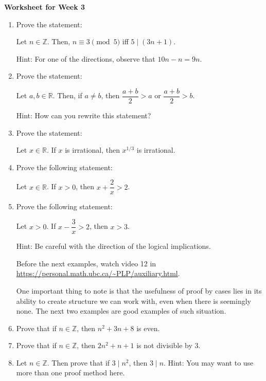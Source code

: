 \documentclass[12pt]{article}
\begin{document}
\centerline{\bf\large Worksheet for Week 3}

\vspace{25pt}


\begin{enumerate}


\item  Prove the statement:
\begin{center}
Let $n\in\mathbb Z$. Then, $n\equiv 3 \pmod 5$ iff $5\mid (3n+1)$.
\end{center}
Hint: For one of the directions, observe that $10n-n=9n$.


\item Prove the statement:
\begin{center}
Let $a,b \in\mathbb R$. Then, if $a\neq b$, then $\dfrac{a+b}{2}>a$ or  $\dfrac{a+b}{2}>b$.
\end{center}	
Hint: How can you rewrite this statement?

\item Prove the statement:
\begin{center}
Let $x\in\mathbb R$. If $x$ is irrational, then $x^{1/3}$ is irrational.
\end{center}


\item Prove the following statement:
\begin{center}
Let $x\in\mathbb R$. If $x>0$, then $x+\dfrac{2}{x}>2$.
\end{center}

\item Prove the following statement:
\begin{center}
Let $x>0$. If $x-\dfrac{3}{x}>2$, then $x>3$.
\end{center}
Hint: Be careful with the direction of the logical implications.

Before the next examples, watch video 12 in \url{https://personal.math.ubc.ca/~PLP/auxiliary.html}. 

One important thing to note is that the usefulness of proof by cases lies in its ability to create structure we can work with, even when there is seemingly none. The next two examples are good examples of such situation.

\item Prove that if $n\in\mathbb Z$, then $n^2+3n+8$ is even.

\item Prove that if $n\in\mathbb Z$, then $2n^2+n+1$ is not divisible by $3$.

\item Let $n\in\mathbb Z$. Then prove that if $3\mid n^2$, then $3\mid n$.
Hint: You may want to use more than one proof method here.


\end{enumerate}
\end{document}
